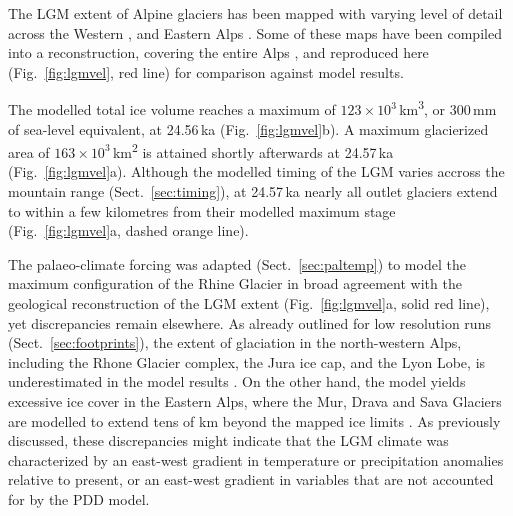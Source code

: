 \documentclass[tc, manuscript]{copernicus}
\begin{document}
    The LGM extent of Alpine glaciers has been mapped with varying level of
    detail across the Western \citep{Jackli.1962, Bini.etal.2009,
    Coutterand.2010, Buoncristiani.Campy.2011, Hantke.2011}, and Eastern Alps
    \citep{Penck.Bruckner.1909, Castiglioni.1940, Husen.1987, BGR.2007,
    Husen.2011, Bavec.Verbic.2011}. Some of these maps have been compiled
    into a reconstruction, covering the entire Alps \citep{Ehlers.etal.2011},
    and reproduced here (Fig.~\ref{fig:lgmvel}, red line) for comparison
    against model results.

    The modelled total ice volume reaches a maximum of $123 \times
    10^{3}$\,\unit{km^3}, or 300\,mm of sea-level equivalent, at 24.56\,ka
    (Fig.~\ref{fig:lgmvel}b). A maximum glacierized area of $163 \times
    10^{3}$\,\unit{km^2} is attained shortly afterwards at 24.57\,ka
    (Fig.~\ref{fig:lgmvel}a). Although the modelled timing of the LGM varies
    accross the mountain range (Sect.~\ref{sec:timing}), at 24.57\,ka nearly
    all outlet glaciers extend to within a few kilometres from their modelled
    maximum stage (Fig.~\ref{fig:lgmvel}a, dashed orange line).

    The palaeo-climate forcing was adapted (Sect.~\ref{sec:paltemp})
    to model the maximum configuration of the Rhine Glacier in broad agreement
    with the geological
    reconstruction of the LGM extent (Fig.~\ref{fig:lgmvel}a, solid red line),
    yet discrepancies remain elsewhere. As already outlined for low resolution
    runs (Sect.~\ref{sec:footprints}), the extent of glaciation in the
    north-western Alps, including the Rhone Glacier complex, the Jura ice cap,
    and the Lyon Lobe, is underestimated in the model results
    \citep[Fig.~\ref{fig:lgmvel}a, cf][]{Bini.etal.2009, Coutterand.2010}.
    On the other hand, the model yields excessive ice
    cover in the Eastern Alps, where the Mur, Drava and Sava Glaciers are
    modelled to extend tens of km beyond the mapped ice limits
    \citep[Fig.~\ref{fig:lgmvel}a, cf][]{Husen.1987, Bavec.Verbic.2011}.
    As previously discussed, these discrepancies might indicate that the
    LGM climate was characterized by an east-west gradient in temperature
    \citep[cf.][]{Heyman.etal.2013} or precipitation
    \citep[cf.][]{Wu.etal.2007} anomalies relative to present, or an east-west
    gradient in variables that are not accounted for by the PDD model.
\end{document}
